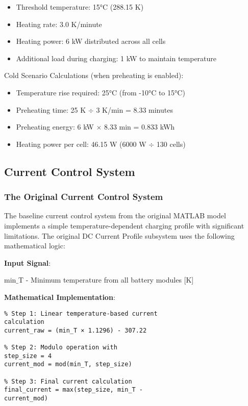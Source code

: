 \documentclass[conference]{IEEEtran}
\begin{document}
\begin{itemize}

\item Threshold temperature: 15°C (288.15 K)
\item Heating rate: 3.0 K/minute
\item Heating power: 6 kW distributed across all cells
\item Additional load during charging: 1 kW to maintain temperature

\end{itemize}

Cold Scenario Calculations (when preheating is enabled):

\begin{itemize}
    \item Temperature rise required: 25°C (from -10°C to 15°C)
    \item Preheating time: 25 K $\div$ 3 K/min = 8.33 minutes
    \item Preheating energy: 6 kW $\times$ 8.33 min = 0.833 kWh
    \item Heating power per cell: 46.15 W (6000 W $\div$ 130 cells)
\end{itemize}

\subsection{\textbf{Current Control System}}
\subsubsection{\textbf{The Original Current Control System}}

The baseline current control system from the original MATLAB model implements a simple temperature-dependent charging profile with significant limitations. The original DC Current Profile subsystem uses the following mathematical logic:

\textbf{Input Signal}:

min$\_$T - Minimum temperature from all battery modules [K]

\textbf{Mathematical Implementation}:

\begin{verbatim}
% Step 1: Linear temperature-based current 
calculation
current_raw = (min_T × 1.1296) - 307.22

% Step 2: Modulo operation with
step_size = 4
current_mod = mod(min_T, step_size)

% Step 3: Final current calculation
final_current = max(step_size, min_T -
current_mod)

\end{verbatim}
\end{document}

